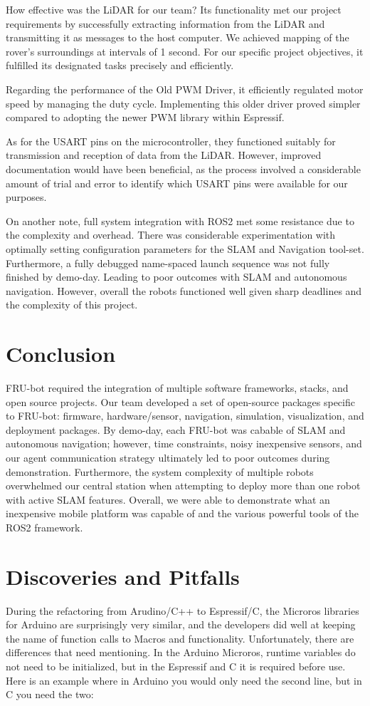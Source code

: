 \documentclass[conference]{IEEEtran}
\begin{document}
How effective was the LiDAR for our team? Its functionality met our project requirements by successfully extracting information from the LiDAR and transmitting it as messages to the host computer. We achieved mapping of the rover's surroundings at intervals of 1 second. For our specific project objectives, it fulfilled its designated tasks precisely and efficiently.

Regarding the performance of the Old PWM Driver, it efficiently regulated motor speed by managing the duty cycle. Implementing this older driver proved simpler compared to adopting the newer PWM library within Espressif.

As for the USART pins on the microcontroller, they functioned suitably for transmission and reception of data from the LiDAR. However, improved documentation would have been beneficial, as the process involved a considerable amount of trial and error to identify which USART pins were available for our purposes.

On another note, full system integration with ROS2 met some resistance due to the complexity and overhead. There was considerable experimentation with optimally setting configuration parameters for the SLAM and Navigation tool-set. Furthermore, a fully debugged name-spaced launch sequence was not fully finished by demo-day. Leading to poor outcomes with SLAM and autonomous navigation. However, overall the robots functioned well given sharp deadlines and the complexity of this project. 

\section{Conclusion}
FRU-bot required the integration of multiple software frameworks, stacks, and open source projects. Our team developed a set of open-source packages specific to FRU-bot: firmware, hardware/sensor, navigation, simulation, visualization, and deployment packages. By demo-day, each FRU-bot was cabable of SLAM and autonomous navigation; however, time constraints, noisy inexpensive sensors, and our agent communication strategy ultimately led to poor outcomes during demonstration. Furthermore, the system complexity of multiple robots overwhelmed our central station when attempting to deploy more than one robot with active SLAM features. Overall, we were able to demonstrate what an inexpensive mobile platform was capable of and the various powerful tools of the ROS2 framework. 

\section{Discoveries and Pitfalls}  
During the refactoring from Arudino/C++ to Espressif/C, the Microros libraries for Arduino are surprisingly very similar, and the developers did well at keeping the name of function calls to Macros and functionality. Unfortunately, there are differences that need mentioning. In the Arduino Microros, runtime variables do not need to be initialized, but in the Espressif and C it is required before use. Here is an example where in Arduino you would only need the second line, but in C you need the two:
\end{document}
